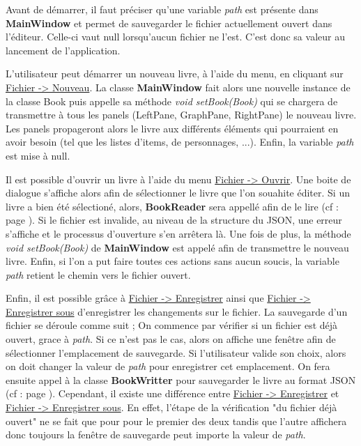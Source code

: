 				Avant de démarrer, il faut préciser qu'une variable \textit{path} est présente dans \textbf{MainWindow} et permet de sauvegarder le fichier actuellement ouvert dans l'éditeur. Celle-ci vaut null lorsqu'aucun fichier ne l'est. C'est donc sa valeur au lancement de l'application.

				L'utilisateur peut démarrer un nouveau livre, à l'aide du menu, en cliquant sur \underline{Fichier -> Nouveau}. La classe \textbf{MainWindow} fait alors une nouvelle instance de la classe Book puis appelle sa méthode \textit{void setBook(Book)} qui se chargera de transmettre à tous les panels (LeftPane, GraphPane, RightPane) le nouveau livre. Les panels propageront alors le livre aux différents éléments qui pourraient en avoir besoin (tel que les listes d'items, de personnages, ...). Enfin, la variable \textit{path} est mise à null.

				Il est possible d'ouvrir un livre à l'aide du menu \underline{Fichier -> Ouvrir}. Une boite de dialogue s'affiche alors afin de sélectionner le livre que l'on souahite éditer. Si un livre a bien été sélectioné, alors, \textbf{BookReader} sera appellé afin de le lire (cf :  page \pageref{subsec:lecture_ecriture_fichier}). Si le fichier est invalide, au niveau de la structure du JSON, une erreur s'affiche et le processus d'ouverture s'en arrêtera là. Une fois de plus, la méthode \textit{void setBook(Book)} de \textbf{MainWindow} est appelé afin de transmettre le nouveau livre. Enfin, si l'on a put faire toutes ces actions sans aucun soucis, la variable \textit{path} retient le chemin vers le fichier ouvert.

				Enfin, il est possible grâce à \underline{Fichier -> Enregistrer} ainsi que \underline{Fichier -> Enregistrer sous} d'enregistrer les changements sur le fichier. La sauvegarde d'un fichier se déroule comme suit ; On commence par vérifier si un fichier est déjà ouvert, grace à \textit{path}. Si ce n'est pas le cas, alors on affiche une fenêtre afin de sélectionner l'emplacement de sauvegarde. Si l'utilisateur valide son choix, alors on doit changer la valeur de \textit{path} pour enregistrer cet emplacement. On fera ensuite appel à la classe \textbf{BookWritter} pour sauvegarder le livre au format JSON (cf :  page \pageref{subsec:lecture_ecriture_fichier}). Cependant, il existe une différence entre \underline{Fichier -> Enregistrer} et \underline{Fichier -> Enregistrer sous}. En effet, l'étape de la vérification "du fichier déjà ouvert" ne se fait que pour pour le premier des deux tandis que l'autre affichera donc toujours la fenêtre de sauvegarde peut importe la valeur de \textit{path}.

